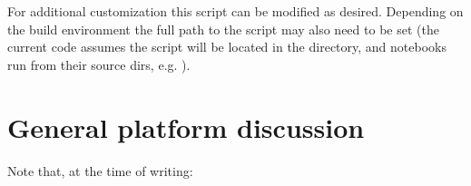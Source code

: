 \documentclass[letterpaper,table,10pt,english]{jupyterBook}
\begin{document}
\begin{sphinxVerbatim}[commandchars=\\\{\}]
 
\end{sphinxVerbatim}

\sphinxAtStartPar
For additional customization this script can be modified as desired. Depending on the build environment the full path to the script may also need to be set (the current code assumes the script will be located in the  directory, and notebooks run from their source dirs, e.g. ).


\section{General platform discussion}
\label{\detokenize{part1/platform_intro_070723:general-platform-discussion}}\label{\detokenize{part1/platform_intro_070723:sect-platform-general}}
\sphinxAtStartPar
Note that, at the time of writing:
\end{document}
